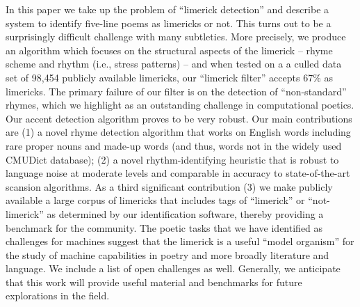In this paper we take up the problem of ``limerick detection'' and describe a system to identify five-line poems as limericks or not. This turns out to be a surprisingly difficult challenge with many subtleties. More precisely, we produce an algorithm  which focuses on the structural aspects of the limerick -- rhyme scheme and rhythm (i.e., stress patterns) -- and when tested on a  a culled data set of 98,454 publicly available limericks, our ``limerick filter'' accepts 67\% as limericks. The primary failure of our filter is on the detection of ``non-standard'' rhymes, which we highlight as an outstanding challenge in computational poetics. Our accent detection algorithm proves to be very robust. Our main contributions are (1) a novel rhyme detection algorithm that works on English words including rare proper nouns and made-up words (and thus, words not in the widely used CMUDict database); (2) a novel rhythm-identifying heuristic that is robust to language noise at moderate levels and comparable in accuracy to state-of-the-art scansion algorithms. As a third significant contribution (3) we make publicly available a large corpus of limericks that includes tags of ``limerick'' or ``not-limerick'' as determined by our identification software, thereby providing a benchmark for the community. The poetic tasks that we have identified as challenges for machines suggest that the limerick is a useful ``model organism'' for the study of machine capabilities in poetry and more broadly literature and language. We include a list of open challenges as well. Generally, we anticipate that this work will provide useful material and benchmarks for future explorations in the field.
